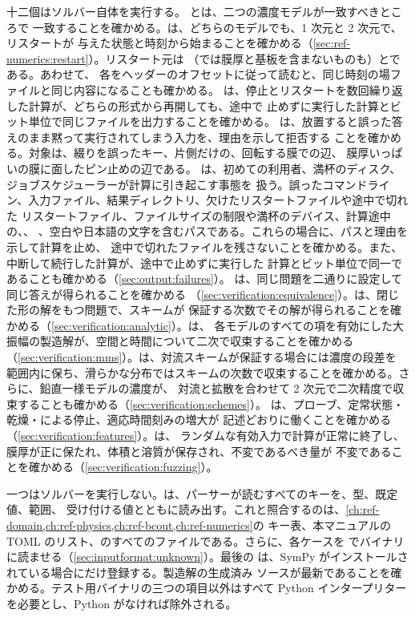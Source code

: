 十二個はソルバー自体を実行する。
とは、二つの濃度モデルが一致すべきところで
一致することを確かめる。は、どちらのモデルでも、1 次元と 2 次元で、リスタートが
与えた状態と時刻から始まることを確かめる（\cref{sec:ref-numerics:restart}）。リスタート元は
（では膜厚と基板を含まないものも）とである。あわせて、
各をヘッダーのオフセットに従って読むと、同じ時刻の場ファイルと同じ内容になることも確かめる。
は、停止とリスタートを数回繰り返した計算が、どちらの形式から再開しても、途中で
止めずに実行した計算とビット単位で同じファイルを出力することを確かめる。
は、放置すると誤った答えのまま黙って実行されてしまう入力を、理由を示して拒否する
ことを確かめる。対象は、綴りを誤ったキー、片側だけの、回転する膜での辺、
膜厚いっぱいの膜に面したピン止めの辺である。
は、初めての利用者、満杯のディスク、ジョブスケジューラーが計算に引き起こす事態を
扱う。誤ったコマンドライン、入力ファイル、結果ディレクトリ、欠けたリスタートファイルや途中で切れた
リスタートファイル、ファイルサイズの制限や満杯のデバイス、計算途中の、、
、空白や日本語の文字を含むパスである。これらの場合に、パスと理由を示して計算を止め、
途中で切れたファイルを残さないことを確かめる。また、中断して続行した計算が、途中で止めずに実行した
計算とビット単位で同一であることも確かめる（\cref{sec:output:failures}）。
は、同じ問題を二通りに設定して同じ答えが得られることを確かめる
（\cref{sec:verification:equivalence}）。は、閉じた形の解をもつ問題で、スキームが
保証する次数でその解が得られることを確かめる（\cref{sec:verification:analytic}）。は、
各モデルのすべての項を有効にした大振幅の製造解が、空間と時間について二次で収束することを確かめる
（\cref{sec:verification:mms}）。は、対流スキームが保証する場合には濃度の段差を
範囲内に保ち、滑らかな分布ではスキームの次数で収束することを確かめる。さらに、鉛直一様モデルの濃度が、
対流と拡散を合わせて 2 次元で二次精度で収束することも確かめる（\cref{sec:verification:schemes}）。
は、プローブ、定常状態・乾燥・による停止、適応時間刻みの増大が
記述どおりに働くことを確かめる（\cref{sec:verification:features}）。は、
ランダムな有効入力で計算が正常に終了し、膜厚が正に保たれ、体積と溶質が保存され、不変であるべき量が
不変であることを確かめる（\cref{sec:verification:fuzzing}）。

一つはソルバーを実行しない。は、パーサーが読むすべてのキーを、型、既定値、範囲、
受け付ける値とともに読み出す。これと照合するのは、\cref{ch:ref-domain,ch:ref-physics,ch:ref-bcout,ch:ref-numerics}の
キー表、本マニュアルの TOML のリスト、のすべてのファイルである。さらに、各ケースを
でバイナリに読ませる（\cref{sec:inputformat:unknown}）。最後の
は、SymPy がインストールされている場合にだけ登録する。製造解の生成済み
ソースが最新であることを確かめる。テスト用バイナリの三つの項目以外はすべて Python
インタープリターを必要とし、Python がなければ除外される。


